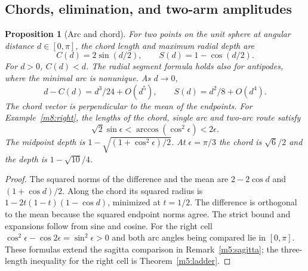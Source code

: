 \documentclass[11pt,reqno]{amsart}
\newtheorem{proposition}[theorem]{Proposition}
\theoremstyle{definition}
\theoremstyle{remark}
\numberwithin{equation}{section}
\begin{document}
\subsection{Chords, elimination, and two-arm amplitudes}

\begin{proposition}[Arc and chord]\label{m8:chord}
For two points on the unit sphere at angular distance $d\in[0,\pi]$,
the chord length and maximum radial depth are
\[
 C(d)=2\sin(d/2),\qquad S(d)=1-\cos(d/2).
\]
For $d>0$, $C(d)<d$. The radial segment formula holds also for
antipodes, where the minimal arc is nonunique. As $d\to0$,
\[
 d-C(d)=d^3/24+O(d^5),\qquad S(d)=d^2/8+O(d^4).
\]
The chord vector is perpendicular to the mean of the endpoints.
For Example~\ref{m8:right}, the lengths of the chord, single arc
and two-arc route satisfy
\[
 \sqrt2\sin\epsilon <\arccos(\cos^2\epsilon)<2\epsilon.
\]
The midpoint depth is $1-\sqrt{(1+\cos^2\epsilon)/2}$.
At $\epsilon=\pi/3$ the chord is $\sqrt6/2$ and the depth is
$1-\sqrt{10}/4$.
\end{proposition}
\begin{proof}
The squared norms of the difference and the mean are
$2-2\cos d$ and $(1+\cos d)/2$. Along the chord its squared radius
is $1-2t(1-t)(1-\cos d)$, minimized at $t=1/2$. The difference is
orthogonal to the mean because the squared endpoint norms agree.
The strict bound and expansions follow from sine and cosine.
For the right cell $\cos^2\epsilon-\cos2\epsilon=\sin^2\epsilon>0$
and both arc angles being compared lie in $[0,\pi]$.
These formulas extend the sagitta comparison in
Remark~\ref{m5:sagitta}; the three-length inequality for the right cell is Theorem~\ref{m5:ladder}.
\end{proof}
\end{document}
